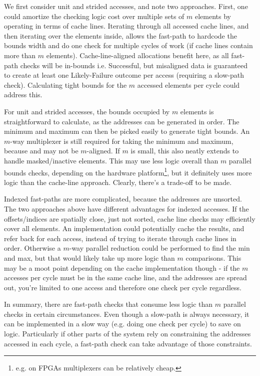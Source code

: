 We first consider unit and strided accesses, and note two approaches.
First, one could amortize the checking logic cost over multiple sets of $m$ elements by operating in terms of cache lines.
Iterating through all accessed cache lines, and then iterating over the elements inside, allows the fast-path to hardcode the bounds width and do one check for multiple cycles of work (if cache lines contain more than $m$ elements).
Cache-line-aligned allocations benefit here, as all fast-path checks will be in-bounds i.e. Successful, but misaligned data is guaranteed to create at least one Likely-Failure outcome per access (requiring a slow-path check).
Calculating tight bounds for the $m$ accessed elements per cycle could address this.

For unit and strided accesses, the bounds occupied by $m$ elements is straightforward to calculate, as the addresses can be generated in order.
The minimum and maximum can then be picked easily to generate tight bounds.
An $m$-way multiplexer is still required for taking the minimum and maximum, because  and  may not be $m$-aligned.
If $m$ is small, this also neatly extends to handle masked/inactive elements.
This may use less logic overall than $m$ parallel bounds checks, depending on the hardware platform\footnote{e.g. on FPGAs multiplexers can be relatively cheap.}, but it definitely uses more logic than the cache-line approach.
Clearly, there's a trade-off to be made.

Indexed fast-paths are more complicated, because the addresses are unsorted.
The two approaches above have different advantages for indexed accesses.
If the offsets/indices are spatially close, just not sorted, cache line checks may efficiently cover all elements.
An implementation could potentially cache the results, and refer back for each access, instead of trying to iterate through cache lines in order.
Otherwise a $m$-way parallel reduction could be performed to find the min and max, but that would likely take up more logic than $m$ comparisons.
This may be a moot point depending on the cache implementation though - if the $m$ accesses per cycle must be in the same cache line, and the addresses are spread out, you're limited to one access and therefore one check per cycle regardless.

In summary, there are fast-path checks that consume less logic than $m$ parallel checks in certain circumstances.
Even though a slow-path is always necessary, it can be implemented in a slow way (e.g. doing one check per cycle) to save on logic.
Particularly if other parts of the system rely on constraining the addresses accessed in each cycle, a fast-path check can take advantage of those constraints. 